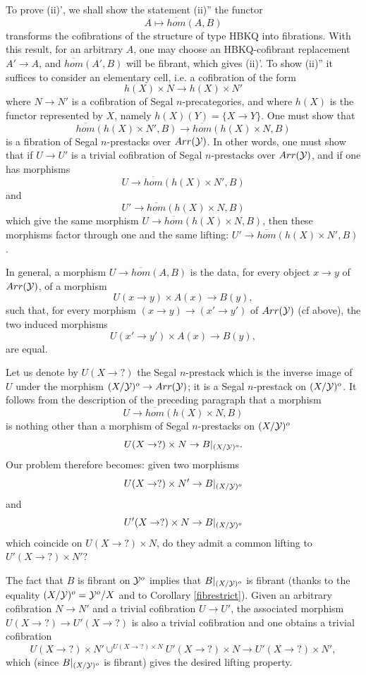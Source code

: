 To prove (ii)', we shall show the statement
\newline
(ii)'' the functor
$$
A\mapsto \overline{hom}(A,B)
$$
transforms the cofibrations of the structure of type
HBKQ into fibrations.
\newline
With this result, for an arbitrary $A$,
one may choose an HBKQ-cofibrant replacement
$A'\rightarrow A$, and $\overline{hom}(A',B)$ will be fibrant, which
gives (ii)'. To show (ii)'' it suffices to consider an elementary
cell, i.e. a cofibration of the form
$$
h(X) \times N \rightarrow h(X) \times N'
$$
where $N\rightarrow N'$ is a cofibration of Segal $n$-precategories, and
where $h(X)$ is the functor represented by $X$, namely
$h(X)(Y)=\{ X\rightarrow Y\}$. One must show that
$$
\overline{hom}( h(X) \times N',B)\rightarrow
\overline{hom}( h(X) \times N,B)
$$
is a fibration of Segal $n$-prestacks over $Arr({\cal Y} )$.
In other words, one must show that if $U\rightarrow U'$ is a trivial
cofibration
of Segal $n$-prestacks over $Arr({\cal Y} )$,
and if one has morphisms
$$
U\rightarrow \overline{hom}( h(X) \times N',B)
$$
and
$$
U'\rightarrow \overline{hom}( h(X) \times N,B)
$$
which give the same morphism
$U\rightarrow \overline{hom}( h(X) \times N,B)$, then these morphisms
factor through
one and the same lifting: $U'\rightarrow \overline{hom}( h(X) \times N',B)$.

In general, a morphism
$U\rightarrow \overline{hom}(A,B)$ is the data,
for every object $x\rightarrow y$ of $Arr ({\cal Y} )$, of a morphism
$$
U(x\rightarrow y)\times A(x) \rightarrow B(y),
$$
such that, for every morphism
$(x\rightarrow y)\rightarrow (x'\rightarrow y')$ of $Arr ({\cal Y}
)$ (cf above), the two induced morphisms
$$
U(x'\rightarrow y')\times A(x) \rightarrow B(y),
$$
are equal.

Let us denote by $U(X\rightarrow ?)$ the Segal $n$-prestack which is the
inverse image of $U$ under
the morphism $(X/{\cal Y} )^o \rightarrow Arr ({\cal Y} )$; it is a Segal
$n$-prestack on $(X/{\cal Y} )^o$. It follows from the description of the preceding
paragraph that a morphism
$$
U\rightarrow \overline{hom}( h(X) \times N,B)
$$
is nothing other than a morphism of Segal $n$-prestacks on
$(X/{\cal Y} )^o$
$$
U(X\rightarrow ?)\times N \rightarrow B|_{(X/{\cal Y} )^o}.
$$
Our problem therefore becomes: given two morphisms
$$
U(X\rightarrow ?)\times N' \rightarrow B|_{(X/{\cal Y} )^o}
$$
and
$$
U'(X\rightarrow ?)\times N \rightarrow B|_{(X/{\cal Y} )^o}
$$
which coincide on $U(X\rightarrow ?)\times N$,
do they admit a common lifting
to $U'(X\rightarrow ?)\times N'$?

The fact that $B$ is fibrant on ${\cal Y} ^o$  implies that
$B|_{(X/{\cal Y} )^o}$ is fibrant (thanks
to the equality $(X/{\cal Y} )^o={\cal Y} ^o /X$ and
to Corollary \ref{fibrestrict}). Given an arbitrary cofibration
$N\rightarrow N'$ and a trivial cofibration $U\rightarrow U'$, the
associated morphism $U(X\rightarrow ?)\rightarrow U'(X\rightarrow ?)$
is also a trivial cofibration and one
obtains a trivial cofibration
$$
U(X\rightarrow ?)\times N'\cup ^{U(X\rightarrow ?)\times N}
U'(X\rightarrow ?)\times N \rightarrow U'(X\rightarrow ?)\times N',
$$
which (since
$B|_{(X/{\cal Y} )^o}$ is fibrant) gives the desired lifting property.
\eop


